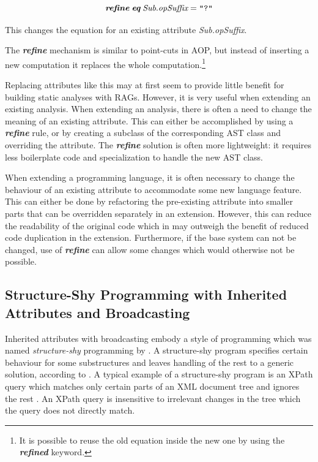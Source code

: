 \documentclass[10pt, twoside, openright]{book}
\begin{document}
\begin{equation*}
\textit{\textbf{refine}} \; \textit{\textbf{eq}} \; \textit{Sub}.\textit{opSuffix} = \texttt{"?"}
\end{equation*}

\noindent
This changes the equation for an existing attribute \emph{Sub.opSuffix}.

The \textbf{\emph{refine}} mechanism is similar to point-cuts in AOP, but instead of inserting a new computation
it replaces the whole computation.\footnote{It is possible to reuse the old equation inside
the new one by using the \textbf{\emph{refined}} keyword.}

Replacing attributes like this may at first seem to provide little benefit for building
static analyses with RAGs. However, it is very useful when extending an existing
analysis.
When extending an analysis, there is often a need to change the meaning of an existing attribute.
This can either be accomplished by using a \textbf{\emph{refine}} rule, or by creating a subclass of
the corresponding AST class and overriding the attribute. The \textbf{\emph{refine}} solution is
often more lightweight: it requires less boilerplate code and specialization to handle the new AST
class.

When extending a programming language, it is often necessary to change the behaviour of an
existing attribute to
accommodate some new language feature. This can either be done by refactoring the pre-existing
attribute into smaller parts that can be overridden separately in an extension.  However, this can
reduce the readability of the original code which in may outweigh the benefit of reduced
code duplication in the extension.  Furthermore, if the base system can not be changed, use of
\textbf{\emph{refine}} can allow some changes which would otherwise not be possible.


{\raggedright
\subsection{Structure-Shy Programming with Inherited Attributes and Broadcasting}
}

\noindent
Inherited attributes with broadcasting embody a style of programming which was named
\emph{structure-shy} programming by \textcite{lieberherr1996adaptive}.  A structure-shy program
specifies certain behaviour for some substructures and leaves handling of the rest to a generic
solution, according to \textcite{DBLP:journals/scp/CunhaV11}.  A typical example of a structure-shy
program is an XPath query which matches only certain parts of an XML document tree and ignores the
rest \cite{DBLP:reference/snam/X14xcf}.  An XPath query is insensitive to irrelevant changes in the
tree which the query does not directly match.
\end{document}
